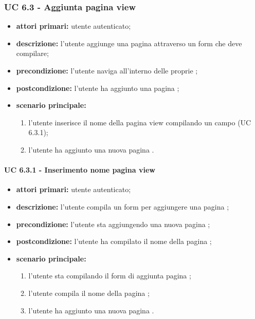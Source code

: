 			\subsubsection{UC 6.3 - Aggiunta pagina view}
			\begin{itemize}
				\item \textbf{attori primari:} utente autenticato;
				\item \textbf{descrizione:} l'utente aggiunge una pagina  attraverso un form che deve compilare;
				\item \textbf{precondizione:} l'utente naviga all'interno delle proprie ;
				\item \textbf{postcondizione:} l'utente ha aggiunto una pagina ;
				\item \textbf{scenario principale:}
				\begin{enumerate}
					\item{l'utente inserisce il nome della pagina view compilando un campo (UC 6.3.1);}
					\item{l'utente ha aggiunto una nuova pagina .}
				\end{enumerate}
			\end{itemize}

			\paragraph{UC 6.3.1 - Inserimento nome pagina view}
			\begin{itemize}
				\item \textbf{attori primari:} utente autenticato;
				\item \textbf{descrizione:} l'utente compila un form per aggiungere una pagina ;
				\item \textbf{precondizione:} l'utente sta aggiungendo una nuova pagina ;
				\item \textbf{postcondizione:} l'utente ha compilato il nome della pagina ;
				\item \textbf{scenario principale:}
				\begin{enumerate}
					\item{l'utente sta compilando il form di aggiunta pagina ;}
					\item{l'utente compila il nome della pagina ;}
					\item{l'utente ha aggiunto una nuova pagina .}
				\end{enumerate}
			\end{itemize}

